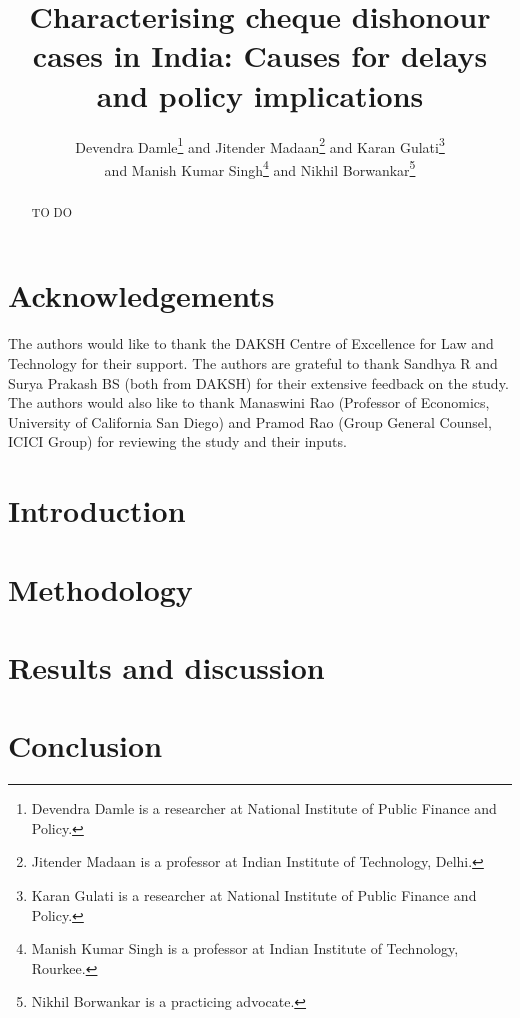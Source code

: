 \documentclass[12pt,a4paper]{article}
\title{Characterising cheque dishonour cases in India: Causes for delays and policy implications}
\author{Devendra Damle\thanks{Devendra Damle is a researcher at National Institute of Public Finance and Policy.} and Jitender Madaan\thanks{Jitender Madaan is a professor at Indian Institute of Technology, Delhi.} and Karan Gulati\thanks{Karan Gulati is a researcher at National Institute of Public Finance and Policy.}\\ and Manish Kumar Singh\thanks{Manish Kumar Singh is a professor at Indian Institute of Technology, Rourkee.} and Nikhil Borwankar\thanks{Nikhil Borwankar is a practicing advocate.}}
\begin{document}
\maketitle

\begin{abstract}
TO DO
\end{abstract}

\newpage
\tableofcontents
\newpage
\printglossaries
\listoftables
\newpage

\section*{Acknowledgements}
The authors would like to thank the DAKSH Centre of Excellence for Law and Technology for their support. The authors are grateful to thank Sandhya R and Surya Prakash BS (both from DAKSH) for their extensive feedback on the study. The authors would also like to thank Manaswini Rao (Professor of Economics, University of California San Diego) and Pramod Rao (Group General Counsel, ICICI Group) for reviewing the study and their inputs.

\newpage
\section{Introduction}
\label{sec:introduction}


\section{Methodology}
\label{sec:methodology}


\section{Results and discussion}
\label{sec:results}


\section{Conclusion}
\label{sec:conclusion}


\newpage
\printbibliography[heading=bibintoc]
\newpage

\begin{appendices}

\end{appendices}
\end{document}

